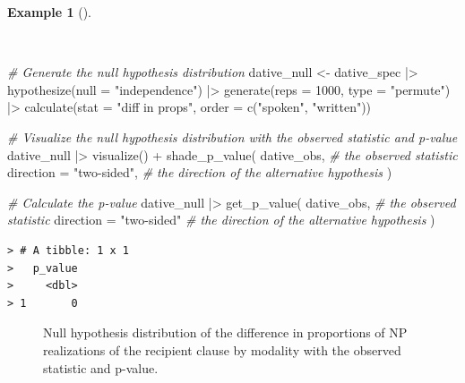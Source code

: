 \documentclass[
  letterpaper,
  DIV=11,
  numbers=noendperiod]{scrreprt}
\newenvironment{Shaded}{\begin{snugshade}}{\end{snugshade}}
\newcommand{\AttributeTok}[1]{\textcolor[rgb]{0.00,0.00,0.00}{#1}}
\newcommand{\CommentTok}[1]{\textcolor[rgb]{0.00,0.00,0.00}{\textit{#1}}}
\newcommand{\DecValTok}[1]{\textcolor[rgb]{0.00,0.00,0.00}{#1}}
\newcommand{\FunctionTok}[1]{\textcolor[rgb]{0.00,0.00,0.00}{#1}}
\newcommand{\NormalTok}[1]{\textcolor[rgb]{0.00,0.00,0.00}{#1}}
\newcommand{\OtherTok}[1]{\textcolor[rgb]{0.00,0.00,0.00}{#1}}
\newcommand{\SpecialCharTok}[1]{\textcolor[rgb]{0.00,0.00,0.00}{#1}}
\newcommand{\StringTok}[1]{\textcolor[rgb]{0.00,0.00,0.00}{#1}}
\theoremstyle{definition}
\newtheorem{example}{Example}[chapter]
\theoremstyle{remark}
\begin{document}
\begin{example}[]\protect\hypertarget{exm-ida-cat-null-hypothesis-bivariate}{}\label{exm-ida-cat-null-hypothesis-bivariate}

~

\begin{Shaded}
\begin{Highlighting}[]
\CommentTok{\# Generate the null hypothesis distribution}
\NormalTok{dative\_null }\OtherTok{\textless{}{-}}
\NormalTok{  dative\_spec }\SpecialCharTok{|\textgreater{}}
  \FunctionTok{hypothesize}\NormalTok{(}\AttributeTok{null =} \StringTok{"independence"}\NormalTok{) }\SpecialCharTok{|\textgreater{}}
  \FunctionTok{generate}\NormalTok{(}\AttributeTok{reps =} \DecValTok{1000}\NormalTok{, }\AttributeTok{type =} \StringTok{"permute"}\NormalTok{) }\SpecialCharTok{|\textgreater{}}
  \FunctionTok{calculate}\NormalTok{(}\AttributeTok{stat =} \StringTok{"diff in props"}\NormalTok{, }\AttributeTok{order =} \FunctionTok{c}\NormalTok{(}\StringTok{"spoken"}\NormalTok{, }\StringTok{"written"}\NormalTok{))}

\CommentTok{\# Visualize the null hypothesis distribution with the observed statistic and p{-}value}
\NormalTok{dative\_null }\SpecialCharTok{|\textgreater{}}
  \FunctionTok{visualize}\NormalTok{() }\SpecialCharTok{+}
  \FunctionTok{shade\_p\_value}\NormalTok{(}
\NormalTok{    dative\_obs, }\CommentTok{\# the observed statistic}
    \AttributeTok{direction =} \StringTok{"two{-}sided"}\NormalTok{, }\CommentTok{\# the direction of the alternative hypothesis}
\NormalTok{  )}

\CommentTok{\# Calculate the p{-}value}
\NormalTok{dative\_null }\SpecialCharTok{|\textgreater{}}
  \FunctionTok{get\_p\_value}\NormalTok{(}
\NormalTok{    dative\_obs, }\CommentTok{\# the observed statistic}
    \AttributeTok{direction =} \StringTok{"two{-}sided"} \CommentTok{\# the direction of the alternative hypothesis}
\NormalTok{  )}
\end{Highlighting}
\end{Shaded}

\begin{verbatim}
> # A tibble: 1 x 1
>   p_value
>     <dbl>
> 1       0
\end{verbatim}

\begin{figure}[H]


\caption{\label{fig-ida-cat-null-hypothesis-bivariate}Null hypothesis
distribution of the difference in proportions of NP realizations of the
recipient clause by modality with the observed statistic and p-value.}

\end{figure}%

\end{example}
\end{document}
